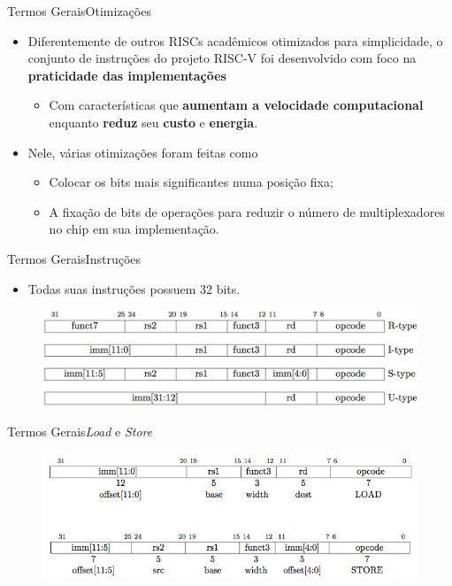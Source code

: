 \documentclass[red, aspectratio=169, xcolor=dvipsnames]{beamer}
\let\olditem=\item%
\renewcommand{\item}{\olditem \justifying}
\begin{document}
\begin{frame}{Termos Gerais}{Otimizações}
	\begin{itemize}
		\setlength{\itemsep}{1em}

		\item Diferentemente de outros RISCs acadêmicos otimizados para simplicidade, o conjunto de instruções do projeto RISC-V foi desenvolvido com foco na \textbf{praticidade das implementações}
		\begin{itemize}
			\item Com características que \textbf{aumentam a velocidade computacional} enquanto \textbf{reduz} seu \textbf{custo} e \textbf{energia}.
		\end{itemize}

		\item Nele, várias otimizações foram feitas como
		\begin{itemize}
			\item Colocar os bits mais significantes numa posição fixa;
			\item A fixação de bits de operações para reduzir o número de multiplexadores no chip em sua implementação.
		\end{itemize}

	\end{itemize}
\end{frame}

\begin{frame}{Termos Gerais}{Instruções}
	\begin{itemize}
		\setlength{\itemsep}{1.2em}
		
		\item Todas suas instruções possuem 32 bits.
	\end{itemize}
		\begin{figure}
			\centering
			\label{fig:inst}
			\includegraphics[width=1\textwidth]{img/instruction.png}
		\end{figure}
\end{frame}

\begin{frame}{Termos Gerais}{\textit{Load} e \textit{Store}}
	\begin{figure}
		\centering
		\label{fig:load-store}
		\includegraphics[width=1\textwidth]{img/load-store.png}
	\end{figure}
\end{frame}
\end{document}
